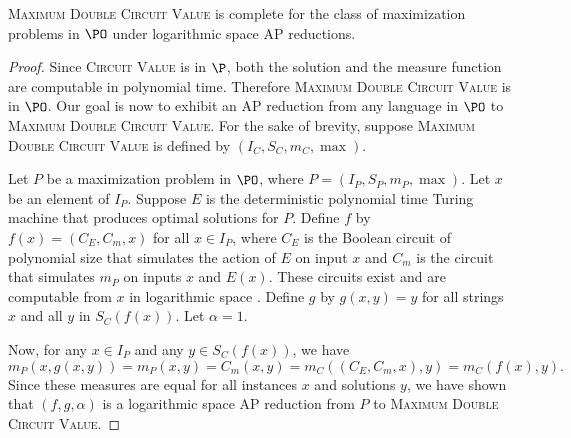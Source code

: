 \begin{theorem}
  \textsc{Maximum Double Circuit Value} is complete for the class of maximization problems in $\PO$ under logarithmic space AP reductions.
\end{theorem}
\begin{proof}
  Since \textsc{Circuit Value} is in $\P$, both the solution and the measure function are computable in polynomial time.
  Therefore \textsc{Maximum Double Circuit Value} is in $\PO$.
  Our goal is now to exhibit an AP reduction from any language in $\PO$ to \textsc{Maximum Double Circuit Value}.
  For the sake of brevity, suppose \textsc{Maximum Double Circuit Value} is defined by $(I_C, S_C, m_C, \max)$.

  Let $P$ be a maximization problem in $\PO$, where $P = (I_P, S_P, m_P, \max)$.
  Let $x$ be an element of $I_P$.
  Suppose $E$ is the deterministic polynomial time Turing machine that produces optimal solutions for $P$.
  Define $f$ by $f(x) = (C_E, C_m, x)$ for all $x \in I_P$, where $C_E$ is the Boolean circuit of polynomial size that simulates the action of $E$ on input $x$ and $C_m$ is the circuit that simulates $m_P$ on inputs $x$ and $E(x)$.
  These circuits exist and are computable from $x$ in logarithmic space \cite{ladner75}.
  Define $g$ by $g(x, y) = y$ for all strings $x$ and all $y$ in $S_C(f(x))$.
  Let $\alpha = 1$.

  Now, for any $x \in I_P$ and any $y \in S_C(f(x))$, we have
  \begin{equation*}
    m_P(x, g(x, y)) = m_P(x, y) = C_m(x, y) = m_C((C_E, C_m, x), y) = m_C(f(x), y).
  \end{equation*}
  Since these measures are equal for all instances $x$ and solutions $y$, we have shown that $(f, g, \alpha)$ is a logarithmic space AP reduction from $P$ to \textsc{Maximum Double Circuit Value}.
\end{proof}

